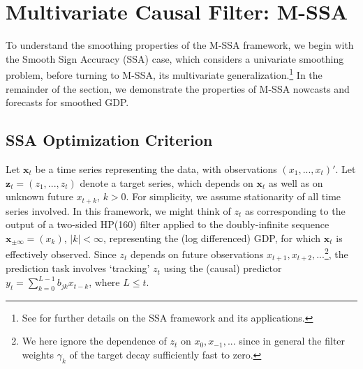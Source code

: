 \documentclass[11pt,a4paper]{article}
\begin{document}
\section{Multivariate Causal Filter: M-SSA}\label{sec:mSSA}

To understand the smoothing properties of the M-SSA framework, we begin with the Smooth Sign Accuracy (SSA) case, which considers a univariate smoothing problem, before turning to M-SSA, its multivariate generalization.\footnote{See \cite{Wildi2024} for further details on the SSA framework and its applications.} In the remainder of the section, we demonstrate the properties of M-SSA nowcasts and forecasts for smoothed GDP.

\subsection{SSA Optimization Criterion}

Let $\mathbf{x}_t$ be a time series representing the data, with observations $(x_{1},...,x_{t})'$. Let $\mathbf{z}_t=(z_{1},...,z_t)$  denote a target series, which depends on $\mathbf{x}_t$ as well as on unknown future $x_{t+k}$, $k>0$. For simplicity, we assume stationarity of all time series involved. In this framework, we might think of ${z}_t$ as corresponding to the output of a two-sided HP(160) filter applied to the doubly-infinite sequence $\mathbf{x}_{\pm \infty}=(x_k)$, $|k|<\infty$, representing the (log differenced) GDP, for which $\mathbf{x}_t$ is effectively observed. Since $z_{t}$  depends on future observations $x_{t+1},x_{t+2},...$\footnote{We here ignore the dependence of $z_t$ on $x_0,x_{-1},...$ since in general the filter weights $\gamma_k$ of the target decay sufficiently fast to zero.}, the prediction task involves `tracking' $z_{t}$  using the (causal) predictor $y_{t}=\sum_{k=0}^{L-1} b_{jk}x_{t-k}$, where $L\leq t$.
\end{document}
